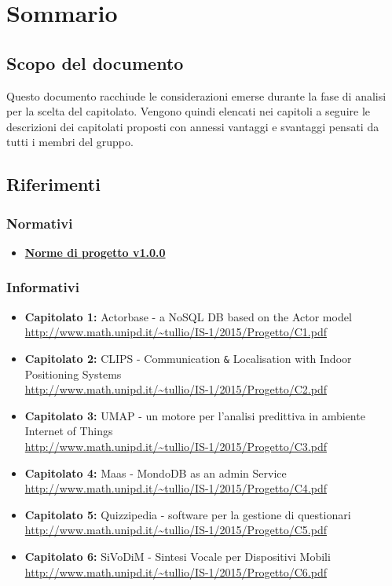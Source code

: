 \documentclass{scalatekids-article}
\begin{document}
\section{Sommario}
\subsection{Scopo del documento}
Questo documento racchiude le considerazioni emerse durante la fase di analisi per la scelta del capitolato.
Vengono quindi elencati nei capitoli a seguire le descrizioni dei capitolati proposti con annessi vantaggi e svantaggi pensati da tutti i membri del gruppo.
\prodPurpose
\glossExpl
\subsection{Riferimenti}
\subsubsection{Normativi}
\begin{itemize}
  \item \href{run:NormeDiProgetto_v0.0.1.tex}{\textbf{Norme di progetto v1.0.0}}
\end{itemize}
\subsubsection{Informativi}
\begin{itemize}
  \item \textbf{Capitolato 1:} Actorbase - a NoSQL DB based on the Actor model\\
  \url{http://www.math.unipd.it/~tullio/IS-1/2015/Progetto/C1.pdf}
  \item \textbf{Capitolato 2:} CLIPS - Communication \verb=&= Localisation with Indoor Positioning Systems\\
  \url{http://www.math.unipd.it/~tullio/IS-1/2015/Progetto/C2.pdf}
  \item \textbf{Capitolato 3:} UMAP - un motore per l'analisi predittiva in ambiente Internet of Things \\
  \url{http://www.math.unipd.it/~tullio/IS-1/2015/Progetto/C3.pdf}
  \item \textbf{Capitolato 4:} Maas - MondoDB as an admin Service \\
  \url{http://www.math.unipd.it/~tullio/IS-1/2015/Progetto/C4.pdf}
  \item \textbf{Capitolato 5:} Quizzipedia - software per la gestione di questionari \\
  \url{http://www.math.unipd.it/~tullio/IS-1/2015/Progetto/C5.pdf}
  \item \textbf{Capitolato 6:} SiVoDiM - Sintesi Vocale per Dispositivi Mobili \\
  \url{http://www.math.unipd.it/~tullio/IS-1/2015/Progetto/C6.pdf}
\end{itemize}
\end{document}
